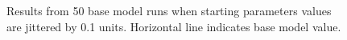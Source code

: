 \documentclass[
]{scrartcl}
\begin{document}
\begin{figure}


\caption{\label{fig-full-jitter}Results from 50 base model runs when
starting parameters values are jittered by 0.1 units. Horizontal line
indicates base model value.}

\end{figure}%
\end{document}
